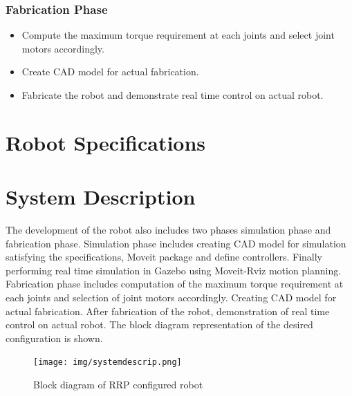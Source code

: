 \documentclass[a4paper,12pt,one side]{report}%
\begin{document}
\subsubsection{Fabrication Phase}
\begin{itemize}
    \item  Compute the maximum torque requirement at each joints and select joint motors accordingly.
    \item Create CAD model for actual fabrication.
    \item Fabricate the robot and demonstrate real time control on actual robot.
\end{itemize}

\section{Robot Specifications}




\section{System Description}

 The development of the robot also includes two phases simulation phase and fabrication phase. Simulation phase includes creating CAD model for simulation satisfying the speciﬁcations, Moveit package and deﬁne controllers. Finally performing real time simulation in Gazebo using Moveit-Rviz motion planning. Fabrication phase includes computation of the maximum torque requirement at each joints and selection of joint motors accordingly. Creating CAD model for actual fabrication. After fabrication of the robot, demonstration of real time control on actual robot. The block diagram representation of the desired configuration is shown.
 
 \begin{figure}[h]
    \centering
    \texttt{[image: img/systemdescrip.png]}
    \caption{Block diagram of RRP configured robot}
    \label{fig:systemdescrip}
\end{figure}
 



    
\end{document}
